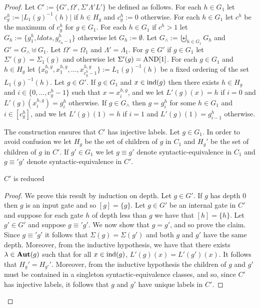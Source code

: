 \documentclass[../paper.tex]{subfiles}
\begin{document}
\begin{proof}
  Let $C' := \{G', \Omega', \Sigma' \Lambda' L'\}$ be defined as follows. For
  each $h \in G_1$ let $c^h_g := \vert L_1(g)^{-1}(h) \vert$ if $h \in H_g$ and
  $c^h_g := 0$ otherwise. For each $h \in G_1$ let $c^h$ be the maximum of
  $c^h_g$ for $g \in G_1$. For each $h \in G_1$ if $c^h > 1$ let $G_h :=
  \{g^{h}_{1}, ldots, g^h_{c_h-1}\}$ otherwise let $G_h := \emptyset$. Let
  $G_{\land} := \biguplus_{h \in G_1} G_h$ and $G' = G_{\land} \uplus G_1$. Let
  $\Omega' = \Omega_1$ and $\Lambda' = \Lambda_1$. For $g \in G'$ if $g \in G_1$
  let $\Sigma'(g) = \Sigma_1(g)$ and otherwise let $\Sigma'(g) = \text{\upshape AND}[1]$. For
  each $g \in G_1$ and $h \in H_g$ let $\{x^{h,g}_0, x^{h,g}_1 ,\ldots,
  x^{h,g}_{c^h_g - 1}\} := L_1(g)^{-1}(h)$ be a fixed ordering of the set
  $L_1(g)^{-1}(h)$. Let $g \in G'$. If $g \in G_1$ and $x \in \text{\upshape ind}(g)$ then
  there exists $h \in H_g$ and $i \in \{0, \ldots , c^h_g -1\}$ such that $x =
  x^{h,g}_i$, and we let $L'(g)(x) = h$ if $i = 0$ and $L'(g)(x^{h,g}_i) =
  g^h_i$ otherwise. If $g \in G_{\land}$ then $g = g^h_i$ for some $h \in G_1$
  and $i \in [c^h_g]$, and we let $L'(g)(1) = h$ if $i = 1$ and $L'(g)(1) =
  g^h_{i-1}$ otherwise.

  The construction ensures that $C'$ has injective labels. Let $g \in G_1$. In
  order to avoid confusion we let $H_g$ be the set of children of $g$ in $C_1$
  and $H_g'$ be the set of children of $g$ in $C'$. If $g' \in G_1$ we let $g
  \equiv g'$ denote syntactic-equivalence in $C_1$ and $g \equiv' g'$ denote
  syntactic-equivalence in $C'$.
  
  \begin{claim}
    $C'$ is reduced
  \end{claim}
  \begin{proof}
    We prove this result by induction on depth. Let $g \in G'$. If $g$ has depth
    $0$ then $g$ is an input gate and so $[g] = \{g\}$. Let $g \in G'$ be an
    internal gate in $C'$ and suppose for each gate $h$ of depth less than $g$
    we have that $[h] = \{ h \}$. Let $g' \in G'$ and suppose $g \equiv' g'$. We
    now show that $g = g'$, and so prove the claim. Since $g \equiv' g'$ it
    follows that $\Sigma (g) = \Sigma(g')$ and both $g$ and $g'$ have the same
    depth. Moreover, from the inductive hypothesis, we have that there exists
    $\lambda \in \text{\textbf{Aut}}(g)$ such that for all $x \in \text{\upshape ind}(g)$, $L'(g) (x) =
    L'(g')(x)$. It follows that $H_{g}' = H_{g'}'$. Moreover, from the inductive
    hypothesis the children of $g$ and $g'$ must be contained in a singleton
    syntactic-equivalence classes, and so, since $C'$ has injective labels, it
    follows that $g$ and $g'$ have unique labels in $C'$.


\end{proof}
\end{proof}
\end{document}
